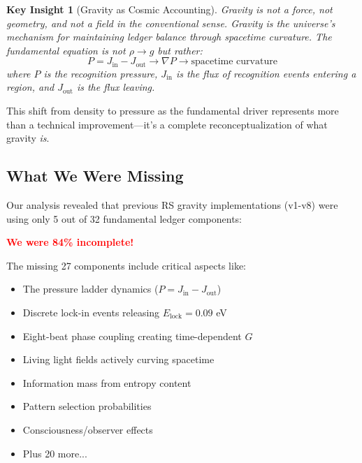 \documentclass[12pt,a4paper]{article}
\newtheorem{insight}[theorem]{Key Insight}
\begin{document}
\begin{insight}[Gravity as Cosmic Accounting]
Gravity is not a force, not geometry, and not a field in the conventional sense. Gravity is the universe's mechanism for maintaining ledger balance through spacetime curvature. The fundamental equation is not $\rho \rightarrow g$ but rather:
\begin{equation}
P = J_{\text{in}} - J_{\text{out}} \rightarrow \nabla P \rightarrow \text{spacetime curvature}
\end{equation}
where $P$ is the recognition pressure, $J_{\text{in}}$ is the flux of recognition events entering a region, and $J_{\text{out}}$ is the flux leaving.
\end{insight}

This shift from density to pressure as the fundamental driver represents more than a technical improvement—it's a complete reconceptualization of what gravity \textit{is}.

\subsection{What We Were Missing}

Our analysis revealed that previous RS gravity implementations (v1-v8) were using only 5 out of 32 fundamental ledger components:

\begin{center}
\textcolor{red}{\textbf{We were 84\% incomplete!}}
\end{center}

The missing 27 components include critical aspects like:
\begin{itemize}
\item The pressure ladder dynamics ($P = J_{\text{in}} - J_{\text{out}}$)
\item Discrete lock-in events releasing $E_{\text{lock}} = 0.09$ eV
\item Eight-beat phase coupling creating time-dependent $G$
\item Living light fields actively curving spacetime
\item Information mass from entropy content
\item Pattern selection probabilities
\item Consciousness/observer effects
\item Plus 20 more...
\end{itemize}
\end{document}
